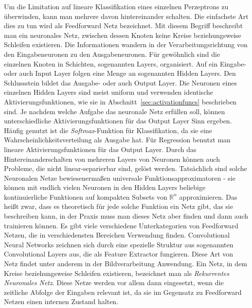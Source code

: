 Um die Limitation auf lineare Klassifikation eines einzelnen Perzeptrons zu überwinden, kann man mehrere davon hintereinander schalten. 
Die einfachste Art dies zu tun wird als Feedforward Netz bezeichnet.
Mit diesem Begriff beschreibt man ein neuronales Netz, zwischen dessen Knoten keine Kreise beziehungsweise Schleifen existieren.
Die Informationen wandern in der Verarbeitungsrichtung von den Eingabeneuronen zu den Ausgabeneuronen.
Für gewöhnlich sind die einzelnen Knoten in Schichten, sogenannten Layers, organisiert.
Auf ein Eingabe- oder auch Input Layer folgen eine Menge an sogenannten Hidden Layers.
Den Schlussstein bildet das Ausgabe- oder auch Output Layer.
Die Neuronen eines einzelnen Hidden Layers sind meist uniform und verwenden identische Aktivierungsfunktionen, wie sie in Abschnitt~\ref{sec:activationfuncs} beschrieben sind.
Je nachdem welche Aufgabe das neuronale Netz erfüllen soll, können unterschiedliche Aktivierungsfunktionen für das Output Layer Sinn ergeben.
Häufig genutzt ist die \textit{Softmax}-Funktion für Klassifikation, da sie eine Wahrscheinlichkeitsverteilung als Ausgabe hat.
Für Regression benutzt man lineare Aktivierungsfunktionen für das Output Layer. 
Durch das Hintereinanderschalten von mehreren Layers von Neuronen können auch Probleme, die nicht linear-separierbar sind, gelöst werden.
Tatsächlich sind solche Neuronalen Netze bewiesenermaßen universale Funktionsapproximatoren - 
sie können mit endlich vielen Neuronen in den Hidden Layers beliebige kontinuierliche Funktionen auf kompakten Subsets von \(\mathbb{R}^n\) approximieren.
Das heißt zwar, dass es theoretisch für jede solche Funktion ein Netz gibt, das sie beschreiben kann, in der Praxis muss man dieses Netz aber finden und dann auch trainieren können.
Es gibt viele verschiedene Unterkategorien von Feedforward Netzen, die in verschiedensten Bereichen Verwendung finden.
Convolutional Neural Networks zeichnen sich durch eine spezielle Struktur aus sogenannten Convolutional Layers aus, die als Feature Extractor fungieren.
Diese Art von Netz findet unter anderem in der Bildverarbeitung Anwendung.
Ein Netz, in dem Kreise beziehungsweise Schleifen existieren, bezeichnet man als \textit{Rekurrentes Neuronales Netz}.
Diese Netze werden vor allem dann eingesetzt, wenn die zeitliche Abfolge der Eingaben relevant ist, 
da sie im Gegensatz zu Feedforward Netzen einen internen Zustand halten.

